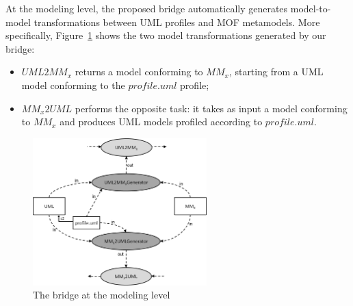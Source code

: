 At the modeling level, the proposed bridge automatically generates model-to-model transformations between UML profiles and MOF metamodels.
More specifically, Figure~\ref{fig:modelingLevel} shows the two model transformations generated by our bridge:
%
\vspace{-.1cm}
\begin{itemize}
	\item $UML2MM_x$ returns a model conforming to $MM_x$, starting from a UML model conforming to the $profile.uml$ profile;
	\item $MM_x2UML$ performs the opposite task: it takes as input a model conforming to $MM_x$
	and produces UML models profiled according to $profile.uml$.
\end{itemize}
%
\vspace{-.4cm}
\begin{figure}[htbp]
	\centering
	\includegraphics[width=0.60\textwidth]{figures/modelingLevel.png}
	\caption{The bridge at the modeling level}
	\label{fig:modelingLevel}
\end{figure}
\vspace{-.4cm}

